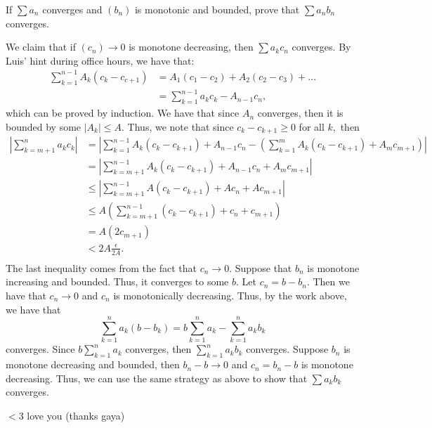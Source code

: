 \documentclass[11pt]{article}
\begin{document}
\begin{reflection}
\begin{problem}
If $\sum a_n$ converges and $(b_n)$ is monotonic and bounded, prove that $\sum a_nb_n$ converges.
\end{problem}
    We claim that if $(c_n)\to 0$ is monotone decreasing, then $\sum a_k c_n$ converges. By Luis' hint during office hours, we have that:
    \begin{align*}
    \sum_{k=1}^{n-1}A_k(c_k - c_{c+1}) &= A_1(c_1 -c_2) + A_2(c_2 - c_3)+ \dots\\
    &= \sum_{k=1}^{n-1}a_kc_k -  A_{n-1}c_{n},
    \end{align*} which can be proved by induction.
    We have that since $A_n$ converges, then it is bounded by some $|A_k|\leq A.$ Thus, we note that since $c_{k} - c_{k+1}\geq 0$ for all $k,$ then
    \begin{align*}
        \left|\sum_{k=m+1}^n a_k c_k\right| &= \left|\sum_{k=1}^{n-1}A_k(c_k - c_{k+1}) + A_{n-1}c_n - (\sum_{k=1}^mA_k(c_{k} - c_{k+1}) + A_mc_{m+1})\right|\\
        &= \left| \sum_{k=m+1}^{n-1}A_k(c_{k} - c_{k+1}) + A_{n-1}c_n + A_mc_{m+1}\right|\\
        &\leq \left| \sum_{k=m+1}^{n-1}A(c_{k} - c_{k+1}) + Ac_n + Ac_{m+1}\right|\\
        &\leq A\left(\sum_{k=m+1}^{n-1}(c_k - c_{k+1}) + c_n + c_{m+1}\right)\\
        &= A \left(2c_{m+1}\right)\\
        &< 2A\frac{\epsilon}{2A}.\\
    \end{align*}
    The last inequality comes from the fact that $c_n \to 0.$ Suppose that $b_n$ is monotone increasing and bounded. Thus, it converges to some $b.$ Let $c_n = b- b_n.$ Then we have that $c_n \to 0$ and $c_n$ is monotonically decreasing. Thus, by the work above, we have that 
    \[\sum_{k=1}^n a_k(b-b_k) = b\sum_{k=1}^na_k - \sum_{k=1}^n a_kb_k\] converges. Since $b\sum_{k=1}^n a_k$ converges, then $\sum_{k=1}^n a_k b_k$ converges. Suppose $b_n$ is monotone decreasing and bounded, then $b_n -b\to 0$ and  $c_n = b_n - b$ is monotone decreasing. Thus, we can use the same strategy as above to show that $\sum a_kb_k$ converges.
\end{reflection}

\newpage
$<$3 love you (thanks gaya)
\end{document}
